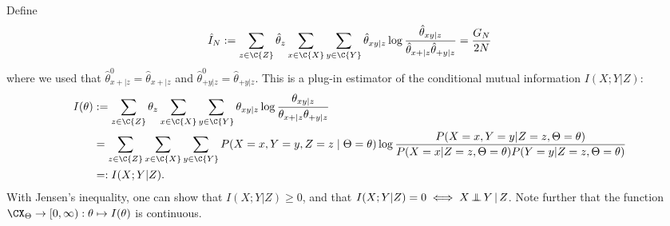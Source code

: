 Define
$$\hat I_N := \sum_{z\in\C{Z}} \hat\theta_{z} \sum_{x\in\C{X}} \sum_{y\in\C{Y}} \hat \theta_{xy|z} \log \frac{\hat \theta_{xy|z}}{\hat \theta_{x+|z} \hat \theta_{+ y|z}}
    = \frac{G_N}{2N}$$
where we used that $\hat\theta^0_{x +|z} = \hat\theta_{x +|z}$ and $\hat\theta^0_{+ y|z} = \hat\theta_{+ y|z}$.
This is a plug-in estimator of the conditional mutual information $I(X;Y|Z)$:
\begin{equation*}\begin{split}
  I(\theta) 
  & := \sum_{z\in\C{Z}} \theta_z \sum_{x\in\C{X}}\sum_{y\in\C{Y}} \theta_{xy|z} \log \frac{\theta_{xy|z}}{\theta_{x +|z} \theta_{+ y|z}} \\
  & = \sum_{z\in\C{Z}} \sum_{x\in\C{X}} \sum_{y\in\C{Y}} P(X=x,Y=y,Z=z \mid \Theta=\theta) \log \frac{P(X=x,Y=y|Z=z,\Theta=\theta)}{P(X=x|Z=z,\Theta=\theta) P(Y=y|Z=z,\Theta=\theta)} \\
  & =: I(X;Y|Z).
\end{split}\end{equation*}
With Jensen's inequality, one can show that $I(X;Y|Z) \ge 0$, and that $I(X;Y|Z) = 0 \iff X \operatorname*{\perp\mkern-11mu\perp} Y \operatorname*{|} Z$.
Note further that the function $\CX_\Theta \to [0,\infty) : \theta \mapsto I(\theta)$ is continuous.

